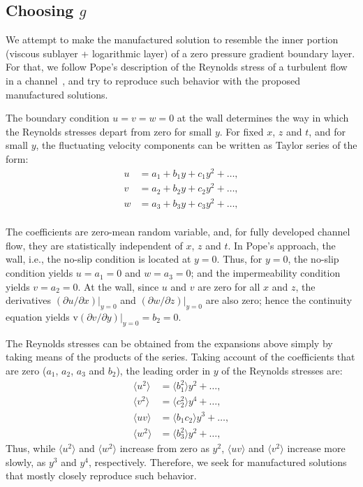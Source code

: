 \documentclass[10pt]{article}
\begin{document}
\subsection{Choosing $g$}
We attempt to make the manufactured solution to resemble the inner portion (viscous sublayer + logarithmic
layer) of a zero pressure gradient boundary layer. For that, we follow Pope's description of the Reynolds stress of a turbulent flow in a channel~\cite{pope2000turbulent}, and try to reproduce such behavior with the proposed manufactured solutions. 

The boundary condition $u=v=w=0$ at the wall determines the way in which the Reynolds stresses depart from zero for small $y$. For fixed $x$, $z$ and $t$, and for small $y$, the fluctuating velocity components can be written as Taylor series of the form:
\begin{equation}
\begin{split}
u &= a_1 + b_1 y + c_1 y^2 + \dots, \\
v &= a_2 + b_2 y + c_2 y^2 + \dots, \\
w &= a_3 + b_3 y + c_3 y^2 + \dots, \\ 
\end{split}
\end{equation}

The coefficients are zero-mean random variable, and, for fully developed channel flow, they are statistically independent of $x$, $z$ and $t$. In Pope's approach, the wall, i.e., the no-slip condition is located at $y=0$. Thus,  for $y=0$, the no-slip condition yields $u=a_1=0$ and $w=a_3=0$; and the impermeability condition yields $v=a_2=0$. At the wall, since $u$ and $v$ are zero for all $x$ and $z$,  the derivatives $(\partial u/ \partial x)|_{y=0}$ and $(\partial w/ \partial z)|_{y=0}$ are also zero; hence the continuity equation yields v$(\partial v/ \partial y)|_{y=0}=b_2=0$.

The Reynolds stresses can be obtained from the expansions above simply by taking means of the products of the series. Taking account of the coefficients that are zero ($a_1$, $a_2$, $a_3$ and $b_2$), the leading order in $y$ of the Reynolds stresses are:
\begin{equation}
\begin{split}\label{eq:Reynolds01}
\langle u^2 \rangle &= \langle b_1^2 \rangle y^2  + \dots, \\
\langle v^2 \rangle &= \langle c_2^2 \rangle y^4 + \dots, \\
\langle uv  \rangle &= \langle b_1 c_2 \rangle y^3 + \dots, \\
\langle w^2 \rangle &= \langle b_3^2 \rangle y^2 + \dots, 
\end{split}
\end{equation}
Thus, while $\langle u^2 \rangle$ and $\langle w^2 \rangle$ increase from zero as $y^2$, $\langle uv  \rangle$ and 
$\langle v^2 \rangle$ increase more slowly, as $y^3$ and $y^4$, respectively. Therefore, we seek for manufactured solutions that mostly closely reproduce such behavior.
\end{document}
